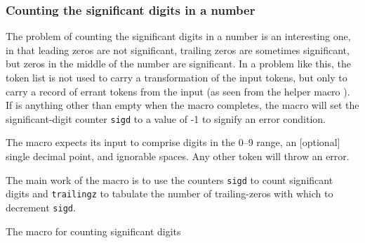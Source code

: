 \documentclass[10pt]{article}
\begin{document}
\endgroup

\subsubsection{Counting the significant digits in a number}

\begingroup

The problem of counting the significant digits in a number is an interesting
  one, in that leading zeros are not significant, trailing zeros are sometimes
  significant, but zeros in the middle of the number are significant. 
In a problem like this, the  token list is not used to
  carry a transformation of the input tokens, but only to carry a record
  of errant tokens from the input (as seen from the helper macro
  ).
If  is anything other than empty when the
  macro completes, the macro will set the significant-digit counter 
  \texttt{sigd} to a value of -1 to signify an error condition.

\medskip
The macro expects its input to comprise digits in the 0--9 range, an [optional]
  single decimal point, and ignorable spaces.  Any other token will throw
  an error.

\medskip
The main work of the  macro is to use the counters
  \texttt{sigd} to count significant digits and \texttt{trailingz} to
  tabulate the number of trailing-zeros with which to decrement
  \texttt{sigd}.

\begin{exampleC}[]{The  macro for counting significant digits}
\newif\iffounddot
\newif\ifzerosig
\newcommand\sigdigits[1]{%
  \setcounter{sigd}{0}%
  \setcounter{trailingz}{0}%
  \founddotfalse%
  \zerosigfalse%
  \tokcycle%
  {\tctestifx{.##1}%
   {\iffounddot\throwerr\fi\founddottrue}%
   {\tctestifnum{`##1>`/}%
    {\tctestifnum{`##1<`:}%
     {\tctestifnum{##1>0}%
      {\stepcounter{sigd}\zerosigtrue\setcounter{trailingz}{0}}%
      {\ifzerosig\stepcounter{sigd}\fi\stepcounter{trailingz}}%
     }%
     {\throwerr}%
    }%
    {\throwerr}%
   }%
  }%
  {\throwerr}%
  {\throwerr}%
  {}%
  {#1}%
  \iffounddot\else\addtocounter{sigd}{-\thetrailingz}\fi%
  \expandafter\ifx\expandafter\relax\detokenize\expandafter{\the\cytoks}%
  \relax\else\setcounter{sigd}{-1}\fi%
  \thesigd
}
\newcommand\throwerr{\addcytoks{##1}}%
\end{exampleC}
\end{document}
